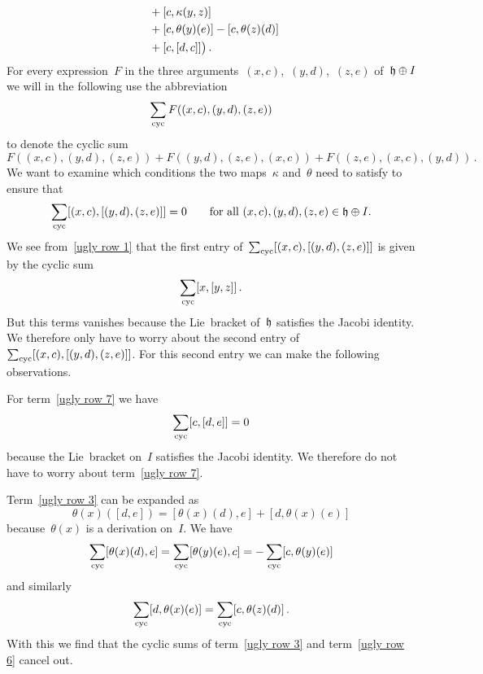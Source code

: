 \begin{fluff}
\begin{enumerate}
\begin{align}
        {}&
        \hphantom{\bigl(}
          + [c, \kappa(y,z)]
        \label{ugly row 5}
        \\
        {}&
        \hphantom{\bigl(}
          + [c, \theta(y)(e)]
          - [c, \theta(z)(d)]
        \label{ugly row 6}
        \\
        {}&
        \hphantom{\bigl(}
          + [c, [d, c]]
        \bigr) \,.
        \label{ugly row 7}
      \end{align}
      For every expression~$F$ in the three arguments~$(x,c)$,~$(y,d)$,~$(z,e)$ of~$\mathfrak{h} \oplus I$ we will in the following use the abbreviation
      \[
        \sum_{\mathrm{cyc}} F( (x,c), (y,d), (z,e) )
      \]
      to denote the cyclic sum
      \[
        F( (x,c), (y,d), (z,e) )
        + F( (y,d), (z,e), (x,c) )
        + F( (z,e), (x,c), (y,d) ) \,.
      \]
      We want to examine which conditions the two maps~$\kappa$ and~$\theta$ need to satisfy to ensure that
      \[
        \sum_{\mathrm{cyc}}
        [(x,c), [(y,d), (z,e)]]
        =
        0
        \qquad
        \text{for all~$(x,c), (y,d), (z,e) \in \mathfrak{h} \oplus I$.}
      \]
      We see from~\eqref{ugly row 1} that the first entry of~$\sum_{\mathrm{cyc}} [(x,c), [(y,d), (z,e)]]$ is given by the cyclic sum
      \[
        \sum_{\mathrm{cyc}} [x,[y,z]] \,.
      \]
      But this terms vanishes because the Lie~bracket of~$\mathfrak{h}$ satisfies the Jacobi identity.
      We therefore only have to worry about the second entry of~$\sum_{\mathrm{cyc}} [(x,c), [(y,d), (z,e)]]$.
      For this second entry we can make the following observations.
      \begin{itemize*}
        \item
          For term~\eqref{ugly row 7} we have
          \[
            \sum_{\mathrm{cyc}} [c,[d,e]] = 0
          \]
          because the Lie~bracket on~$I$ satisfies the Jacobi identity.
          We therefore do not have to worry about term~\eqref{ugly row 7}.
        \item
          Term~\eqref{ugly row 3} can be expanded as
          \[
            \theta(x)([d,e])
            =
            [\theta(x)(d), e] + [d, \theta(x)(e)]
          \]
          because~$\theta(x)$ is a derivation on~$I$.
          We have
          \[
            \sum_{\mathrm{cyc}} [\theta(x)(d), e]
            =
            \sum_{\mathrm{cyc}} [\theta(y)(e), c]
            =
            -\sum_{\mathrm{cyc}} [c, \theta(y)(e)]
          \]
          and similarly
          \[
            \sum_{\mathrm{cyc}} [d, \theta(x)(e)]
            =
            \sum_{\mathrm{cyc}} [c, \theta(z)(d)] \,.
          \]
          With this we find that the cyclic sums of term~\eqref{ugly row 3} and term~\eqref{ugly row 6} cancel out.

\end{itemize*}
\end{enumerate}
\end{fluff}
